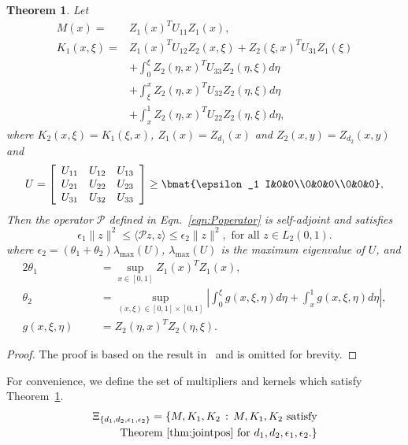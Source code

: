 \documentclass[US letter, 9 pt, conference]{ieeeconf}  \usepackage{setspace}
\newtheorem{theorem}{Theorem}
\newcommand{\lt}{L_2(0,1)}
\begin{document}
\begin{theorem}\label{thm:jointpos}
Let
\begin{align*}
M(x) =& Z_{1}(x)^T U_{11}Z_{1}(x),\\
K_1(x,\xi) = &Z_{1}(x)^T U_{12}Z_{2}(x,\xi) + Z_{2}(\xi,x)^T U_{31}Z_1(\xi)\\
&+\int_0^\xi Z_{2}(\eta,x)^T U_{33}Z_{2}(\eta,\xi)d\eta  \\
&+\int_\xi^x Z_{2}(\eta,x)^T U_{32}Z_{2}(\eta,\xi)d \eta \\
& +\int_x^1 Z_{2}(\eta,x)^T U_{22}Z_{2}(\eta,\xi)d\eta,
\end{align*}
where $K_2(x,\xi) = K_1(\xi,x)$, $Z_1(x) = Z_{d_1}(x)$ and $Z_2(x,y) = Z_{d_2}(x,y)$ and
\begin{equation}\label{eqn:posop1}
U=\left[\begin{array}{ccc} U_{11} & U_{12} & U_{13} \\
U_{21} & U_{22} & U_{23} \\
U_{31} & U_{32} & U_{33}
\end{array} \right] \ge \bmat{\epsilon_1 I&0&0\\0&0&0\\0&0&0},
\end{equation}
Then the operator $\mathcal{P}$ defined in Eqn.~\eqref{eqn:Poperator} is  self-adjoint and satisfies
\[\epsilon_1 \|z\|^2 \leq \langle \mathcal{P}z,z \rangle \leq \epsilon_2 \|z\|^2, \text{ for all } z \in \lt.\]
where $\epsilon_2 = (\theta_1+\theta_2) \lambda_{\max}(U)$, $\lambda_{\max}(U)$ is the maximum eigenvalue of $U$, and
\begin{alignat*}{2}
\theta_1& &&= \sup_{x\in [0,1]} Z_1(x)^T Z_1(x),\\
\theta_2& &&= \sup_{(x,\xi)\in [0,1] \times [0,1]}\left|\int_0^\xi g(x,\xi,\eta) d\eta+\int_x^1 g(x,\xi,\eta) d\eta \right|,\\
g(x,\xi,\eta)& &&= Z_2(\eta,x)^T Z_2(\eta,\xi).
\end{alignat*}
\end{theorem}
\begin{proof}
The proof is based on the result in~\cite{peetlmi} and is omitted for brevity.
\end{proof}
For convenience, we define the set of multipliers and kernels which satisfy Theorem~\ref{thm:jointpos}.
\begin{align*}
 \Xi_{\{d_1,d_2,\epsilon_1,\epsilon_2\}} =\{ M,K_1,K_2 \, : \, M,K_1,K_2 \text{ satisfy}\\
  \text{Theorem~\ref{thm:jointpos} for $d_1,d_2,\epsilon_1,\epsilon_2$.}\}
\end{align*}
\end{document}
